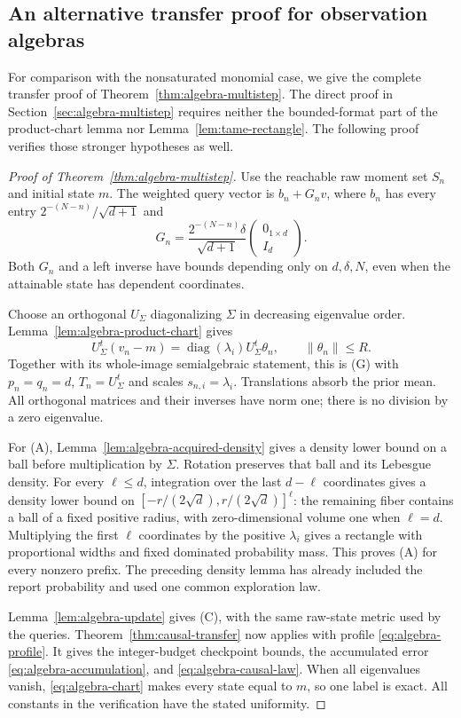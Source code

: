 \subsection{An alternative transfer proof for observation algebras}
\label{sec:algebra-transfer-alternative}
For comparison with the nonsaturated monomial case, we give the complete
transfer proof of Theorem~\ref{thm:algebra-multistep}. The direct proof
in Section~\ref{sec:algebra-multistep} requires neither the bounded-format
part of the product-chart lemma nor Lemma~\ref{lem:tame-rectangle}.
The following proof verifies those stronger hypotheses as well.

\begin{proof}[Proof of Theorem~\ref{thm:algebra-multistep}]
Use the reachable raw moment set $S_n$ and initial state $m$.
The weighted query vector is $b_n+G_nv$, where $b_n$ has every entry
$2^{-(N-n)}/\sqrt{d+1}$ and
\[
 G_n=\frac{2^{-(N-n)}\delta}{\sqrt{d+1}}
                           \begin{pmatrix}0_{1\times d}\\ I_d\end{pmatrix}.
\]
Both $G_n$ and a left inverse have bounds depending only on
$d,\delta,N$, even when the attainable state has dependent coordinates.

Choose an orthogonal $U_\Sigma$ diagonalizing $\Sigma$ in decreasing
eigenvalue order. Lemma~\ref{lem:algebra-product-chart} gives
\[
 U_\Sigma^t(v_n-m)=\operatorname{diag}(\lambda_i)U_\Sigma^t\theta_n,
             \qquad\|\theta_n\|\le R.
\]
Together with its whole-image semialgebraic statement, this is (G) with
$p_n=q_n=d$, $T_n=U_\Sigma^t$ and scales $s_{n,i}=\lambda_i$.
Translations absorb the prior mean. All orthogonal matrices and their
inverses have norm one; there is no division by a zero eigenvalue.

For (A), Lemma~\ref{lem:algebra-acquired-density} gives a density lower
bound on a ball before multiplication by $\Sigma$. Rotation preserves
that ball and its Lebesgue density. For every $\ell\le d$, integration
over the last $d-\ell$ coordinates gives a density lower bound on
$[-r/(2\sqrt d),r/(2\sqrt d)]^\ell$: the remaining fiber contains
a ball of a fixed positive radius, with zero-dimensional volume one
when $\ell=d$. Multiplying the first $\ell$ coordinates by the
positive $\lambda_i$ gives a rectangle with proportional widths and
fixed dominated probability mass. This proves (A) for every nonzero
prefix. The preceding density lemma has already included the report
probability and used one common exploration law.

Lemma~\ref{lem:algebra-update} gives (C), with the same raw-state
metric used by the queries. Theorem~\ref{thm:causal-transfer} now applies
with profile \eqref{eq:algebra-profile}. It gives the integer-budget
checkpoint bounds, the accumulated error \eqref{eq:algebra-accumulation},
and \eqref{eq:algebra-causal-law}. When all eigenvalues vanish,
\eqref{eq:algebra-chart} makes every state equal to $m$, so one label
is exact. All constants in the verification have the stated uniformity.
\end{proof}
